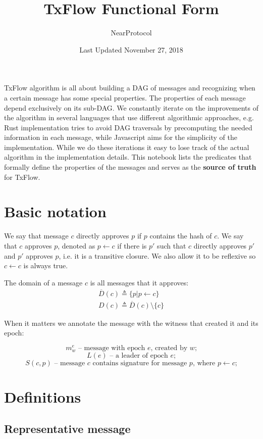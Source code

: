 \documentclass{article}
\title{TxFlow Functional Form}
\author{NearProtocol}
\date{Last Updated November 27, 2018}
\begin{document}
    \maketitle

    TxFlow algorithm is all about building a DAG of messages and recognizing when a certain message has some special properties. The properties of each message depend exclusively on its sub-DAG. We constantly iterate on the improvements of the algorithm in several languages that use different algorithmic approaches, e.g. Rust implementation tries to avoid DAG traversals by precomputing the needed information in each message, while Javascript aims for the simplicity of the implementation. While we do these iterations it easy to lose track of the actual algorithm in the implementation details. This notebook lists the predicates that formally define the properties of the messages and serves as the \textbf{source of truth} for TxFlow.

    \section*{Basic notation}
    We say that message $c$ directly approves $p$ if $p$ contains the hash of $c$. We say that $c$ approves $p$, denoted as $p\leftarrow c$ if there is $p'$ such that $c$ directly approves $p'$ and $p'$ approves $p$, i.e. it is a transitive closure. We also allow it to be reflexive so $c\leftarrow c$ is always true.

    The domain of a message $c$ is all messages that it approves:
    \[
        \begin{aligned}
            \overline{D}(c) \triangleq \{p|p\leftarrow c\} \\
            D(c) \triangleq \overline{D}(c)\setminus\{c\}
        \end{aligned}
    \]

    When it matters we annotate the message with the witness that created it and its epoch:

    \[m_w^e \text{ -- message with epoch $e$, created by $w$;} \]
    \[L(e) \text{ -- a leader of epoch $e$;} \]
    \[S(c, p) \text{ -- message $c$ contains signature for message $p$, where $p\leftarrow c$;}\]

    \section*{Definitions}
    \subsection*{Representative message}
\end{document}
